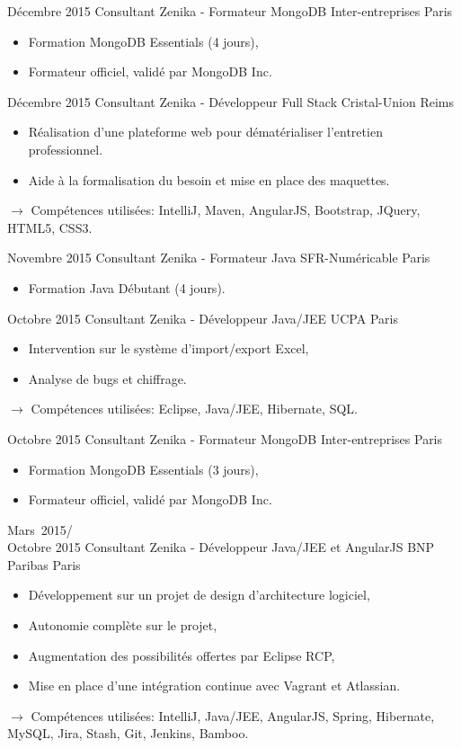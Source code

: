 \documentclass[11pt,a4paper]{moderncv}
\begin{document}
\cventry
{Décembre 2015}
{Consultant Zenika - Formateur MongoDB}
{Inter-entreprises}
{Paris}
{}
{\begin{itemize}
\item Formation MongoDB Essentials (4 jours),
\item Formateur officiel, validé par MongoDB Inc.
\end{itemize}
}   %

\cventry
{Décembre 2015}
{Consultant Zenika - Développeur Full Stack}
{Cristal-Union}
{Reims}
{}
{\begin{itemize}
\item Réalisation d'une plateforme web pour dématérialiser l'entretien professionnel.
\item Aide à la formalisation du besoin et mise en place des maquettes.
\end{itemize}
$\rightarrow$ Compétences utilisées: IntelliJ, Maven, AngularJS, Bootstrap, JQuery, HTML5, CSS3.
}   %

\cventry
{Novembre 2015}
{Consultant Zenika - Formateur Java}
{SFR-Numéricable}
{Paris}
{}
{\begin{itemize}
\item Formation Java Débutant (4 jours).
\end{itemize}
}   %

\cventry
{Octobre 2015}
{Consultant Zenika - Développeur Java/JEE}
{UCPA}
{Paris}
{}
{\begin{itemize}
\item Intervention sur le système d'import/export Excel, 
\item Analyse de bugs et chiffrage.
\end{itemize}
$\rightarrow$ Compétences utilisées: Eclipse, Java/JEE, Hibernate, SQL.
}   %

\cventry
{Octobre 2015}
{Consultant Zenika - Formateur MongoDB}
{Inter-entreprises}
{Paris}
{}
{\begin{itemize}
\item Formation MongoDB Essentials (3 jours),
\item Formateur officiel, validé par MongoDB Inc.
\end{itemize}
}   %

\cventry
{Mars\ 2015/\\Octobre 2015}
{Consultant Zenika - Développeur Java/JEE et AngularJS}
{BNP Paribas}
{Paris}
{}
{\begin{itemize}
\item Développement sur un projet de design d'architecture logiciel,
\item Autonomie complète sur le projet, 
\item Augmentation des possibilités offertes par Eclipse RCP,
\item Mise en place d'une intégration continue avec Vagrant et Atlassian.
\end{itemize}
$\rightarrow$ Compétences utilisées: IntelliJ, Java/JEE, AngularJS, Spring, Hibernate, MySQL, Jira, Stash, Git, Jenkins, Bamboo.
}   %
\end{document}
